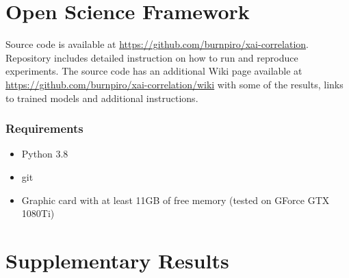 \chapter{Open Science Framework}\label{appendix:osf}
\thispagestyle{chapterBeginStyle}
\label{appendix:source-code}

Source code is available at \url{https://github.com/burnpiro/xai-correlation}. Repository includes detailed instruction on how to run and reproduce experiments. The source code has an additional Wiki page available at \url{https://github.com/burnpiro/xai-correlation/wiki} with some of the results, links to trained models and additional instructions.

\subsection*{Requirements}

\begin{itemize}
  \item Python 3.8
  \item git
  \item Graphic card with at least 11GB of free memory (tested on GForce GTX 1080Ti)
\end{itemize}



\chapter{Supplementary Results}\label{appendix:supplementary}
\thispagestyle{chapterBeginStyle}
\label{appendix:supplementary-results}


